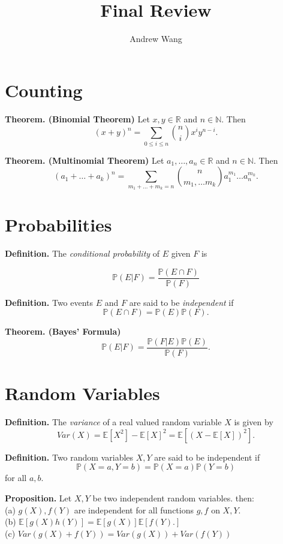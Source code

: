 \documentclass{article}[11pt]
\title{Final Review}
\author{Andrew Wang}
\begin{document}
\maketitle

\section{Counting}

\textbf{Theorem. (Binomial Theorem)} Let $x,y \in \mathbb{R}$ and $n \in \mathbb{N}$. Then
\[
  (x+y)^n = \sum_{0 \leq i \leq n}\binom{n}{i}x^iy^{n-i}.
\]
  
\textbf{Theorem. (Multinomial Theorem)} Let $a_1, \dots, a_n \in \mathbb{R}$ and $n \in \mathbb{N}$. Then
\[
  (a_1 + \dots + a_k)^n = \sum_{m_1 + \dots + m_k = n}\binom{n}{m_1, \dots m_k}a_1^{m_1}\dots a_n^{m_k}.
\]

\section{Probabilities}

\textbf{Definition.} The \emph{conditional probability} of $E$ given $F$ is

$$\mathbb{P}(E|F) = \frac{\mathbb{P}(E\cap F)}{\mathbb{P}(F)}$$

\textbf{Definition.} Two events $E$ and $F$ are said to be \emph{independent} if
$$\mathbb{P}(E\cap F) = \mathbb{P}(E)\mathbb{P}(F).$$

\textbf{Theorem. (Bayes' Formula)} $$\mathbb{P}(E|F)=\frac{\mathbb{P}(F|E)\mathbb{P}(E)}{\mathbb{P}(F)}.$$


\section{Random Variables}

\textbf{Definition.} The \emph{variance} of a real valued random variable $X$ is given by
$$Var(X) = \mathbb{E}[X^2] - \mathbb{E}[X]^2 = \mathbb{E}[(X-\mathbb{E}[X])^2].$$


\textbf{Definition.} Two random variables $X, Y$ are said to be independent if 
$$\mathbb{P}(X=a,Y=b) = \mathbb{P}(X=a)\mathbb{P}(Y =b)$$
for all $a,b$.

\textbf{Proposition.} Let $X, Y$ be two independent random variables. then: \\
(a) $g(X), f(Y)$ are independent for all functions $g,f$ on $X, Y$.\\
(b) $\mathbb{E}[g(X)h(Y)] = \mathbb{E}[g(X)] \mathbb{E}[f(Y).]$\\
(c) $Var(g(X) + f(Y)) = Var(g(X)) + Var(f(Y))$
\end{document}
